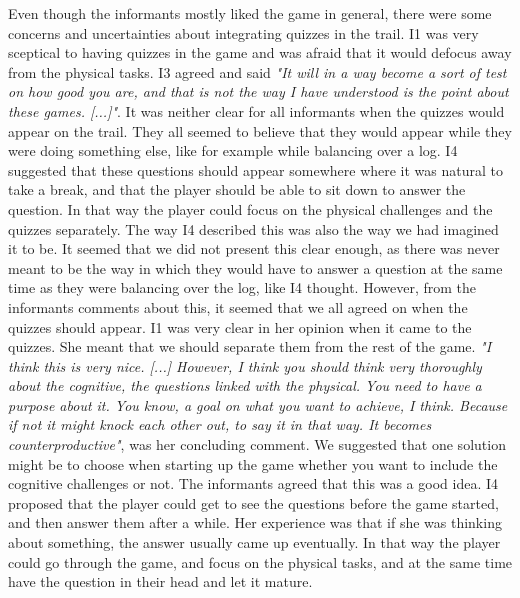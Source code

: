 Even though the informants mostly liked the game in general, there were some concerns and uncertainties about integrating quizzes in the trail. I1 was very sceptical to having quizzes in the game and was afraid that it would defocus away from the physical tasks. I3 agreed and said \emph{"It will in a way become a sort of test on how good you are, and that is not the way I have understood is the point about these games. [...]"}. It was neither clear for all informants when the quizzes would appear on the trail. They all seemed to believe that they would appear while they were doing something else, like for example while balancing over a log. I4 suggested that these questions should appear somewhere where it was natural to take a break, and that the player should be able to sit down to answer the question. In that way the player could focus on the physical challenges and the quizzes separately. The way I4 described this was also the way we had imagined it to be. It seemed that we did not present this clear enough, as there was never meant to be the way in which they would have to answer a question at the same time as they were balancing over the log, like I4 thought. However, from the informants comments about this, it seemed that we all agreed on when the quizzes should appear. I1 was very clear in her opinion when it came to the quizzes. She meant that we should separate them from the rest of the game. \emph{"I think this is very nice. [...] However, I think you should think very thoroughly about the cognitive, the questions linked with the physical. You need to have a purpose about it. You know, a goal on what you want to achieve, I think. Because if not it might knock each other out, to say it in that way. It becomes counterproductive"}, was her concluding comment. We suggested that one solution might be to choose when starting up the game whether you want to include the cognitive challenges or not. The informants agreed that this was a good idea. I4 proposed that the player could get to see the questions before the game started, and then answer them after a while. Her experience was that if she was thinking about something, the answer usually came up eventually. In that way the player could go through the game, and focus on the physical tasks, and at the same time have the question in their head and let it mature. 

